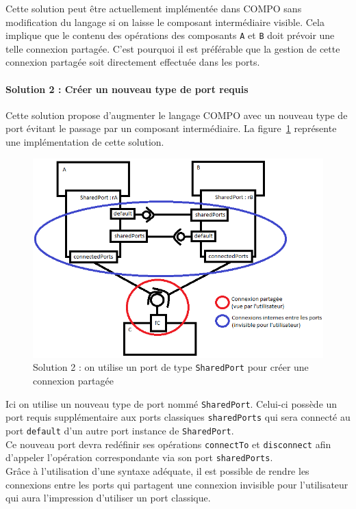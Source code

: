 \documentclass[11pt,a4paper,openany,oneside]{book}
\begin{document}
Cette solution peut être actuellement implémentée dans COMPO sans modification du langage si on laisse le composant intermédiaire visible. Cela implique que le contenu des opérations des composants \texttt{A} et \texttt{B} doit prévoir une telle connexion partagée. C'est pourquoi il est préférable que la gestion de cette connexion partagée soit directement effectuée dans les ports.

\paragraph{Solution 2 : Créer un nouveau type de port requis}
Cette solution propose d'augmenter le langage COMPO avec un nouveau type de port évitant le passage par un composant intermédiaire. La figure~\ref{solution2} représente une implémentation de cette solution.\\
\begin{figure}[H]
\centering
\includegraphics[scale=0.7, keepaspectratio=true]{solution2.png}
\caption{Solution 2 : on utilise un port de type \texttt{SharedPort} pour créer une connexion partagée}
\label{solution2}
\end{figure}
Ici on utilise un nouveau type de port nommé \texttt{SharedPort}. Celui-ci possède un port requis supplémentaire aux ports classiques \texttt{sharedPorts} qui sera connecté au port \texttt{default} d'un autre port instance de \texttt{SharedPort}.\\
Ce nouveau port devra redéfinir ses opérations \texttt{connectTo} et \texttt{disconnect} afin d'appeler l'opération correspondante via son port \texttt{sharedPorts}.\\
Grâce à l'utilisation d'une syntaxe adéquate, il est possible de rendre les connexions entre les ports qui partagent une connexion invisible pour l'utilisateur qui aura l'impression d'utiliser un port classique.
\end{document}
